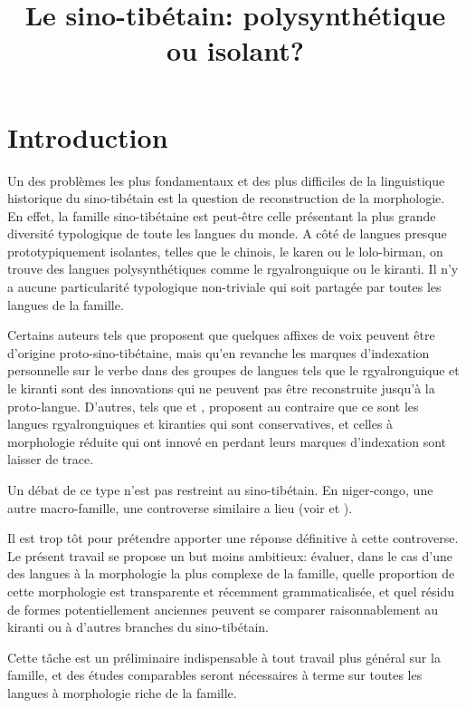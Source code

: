 \documentclass[oldfontcommands,oneside,a4paper,11pt]{article}
\begin{document}
 
\title{Le sino-tibétain: polysynthétique ou isolant?  }
\maketitle
\linenumbers

\section{Introduction}
Un des problèmes les plus fondamentaux et des plus difficiles de la linguistique historique du sino-tibétain est la question de reconstruction de la morphologie. En effet, la famille sino-tibétaine est peut-être celle présentant la plus grande diversité typologique de toute les langues du monde. A côté de langues presque prototypiquement isolantes, telles que le chinois, le karen ou le lolo-birman, on trouve des langues polysynthétiques comme le rgyalronguique ou le kiranti. Il n'y a aucune particularité typologique non-triviale qui soit partagée par toutes les langues de la famille. 

Certains auteurs tels que  \citet{lapolla03} proposent que quelques affixes de voix peuvent être d'origine proto-sino-tibétaine, mais qu'en revanche les marques d'indexation personnelle sur le verbe dans des groupes de langues tels que le rgyalronguique et le kiranti sont des innovations qui ne peuvent pas être reconstruite jusqu'à la proto-langue. D'autres, tels que  \citet{driem93agreement}  et \citet{delancey10agreement}, proposent au contraire que ce sont les langues rgyalronguiques et kiranties qui sont conservatives, et celles à morphologie réduite qui ont innové en perdant leurs marques d'indexation sont laisser de trace.


Un débat de ce type n'est pas restreint au sino-tibétain. En niger-congo, une autre macro-famille, une controverse similaire a lieu (voir  \citealt{guldeman08macrosudan} et  \citealt{hyman11macrosudan}). 

Il est trop tôt pour prétendre apporter une réponse définitive à cette controverse. Le présent travail se propose un but moins ambitieux: évaluer, dans le cas d'une des langues à la morphologie la plus complexe de la famille, quelle proportion de cette morphologie est transparente et récemment grammaticalisée, et quel résidu de formes potentiellement anciennes peuvent se comparer raisonnablement au kiranti ou à d'autres branches du sino-tibétain. 

Cette tâche est un préliminaire indispensable à tout travail plus général sur la famille, et des études comparables seront nécessaires à terme  sur toutes les langues à morphologie riche de la famille.
\end{document}
